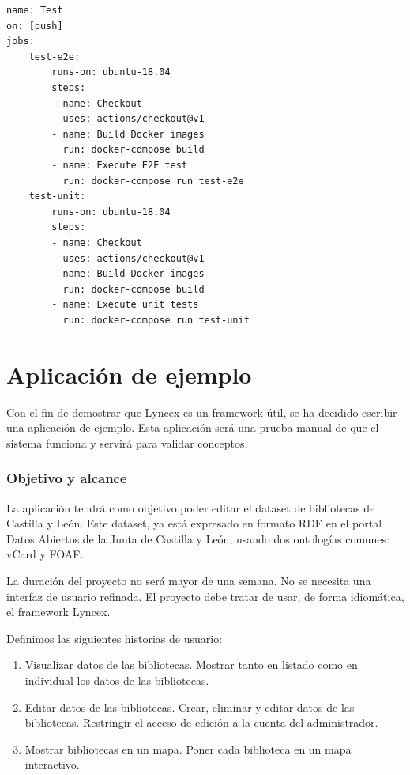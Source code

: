 \documentclass[12pt]{report} %
\begin{document}
\begin{lstlisting}
name: Test
on: [push]
jobs:
    test-e2e:
        runs-on: ubuntu-18.04
        steps:
        - name: Checkout
          uses: actions/checkout@v1
        - name: Build Docker images
          run: docker-compose build
        - name: Execute E2E test
          run: docker-compose run test-e2e
    test-unit:
        runs-on: ubuntu-18.04
        steps:
        - name: Checkout
          uses: actions/checkout@v1
        - name: Build Docker images
          run: docker-compose build
        - name: Execute unit tests
          run: docker-compose run test-unit
\end{lstlisting}

\chapter{Aplicación de ejemplo}

Con el fin de demostrar que Lyncex es un framework útil, se ha decidido escribir una aplicación de ejemplo. Esta aplicación será una prueba manual de que el sistema funciona y servirá para validar conceptos.

\subsection{Objetivo y alcance}

La aplicación tendrá como objetivo poder editar el dataset de bibliotecas de Castilla y León. Este dataset, ya está expresado en formato RDF en el portal Datos Abiertos de la Junta de Castilla y León, usando dos ontologías comunes: vCard y FOAF.

La duración del proyecto no será mayor de una semana. No se necesita una interfaz de usuario refinada. El proyecto debe tratar de usar, de forma idiomática, el framework Lyncex.

Definimos las siguientes historias de usuario:
\begin{enumerate}
    \item Visualizar datos de las bibliotecas. Mostrar tanto en listado como en individual los datos de las bibliotecas.
    \item Editar datos de las bibliotecas. Crear, eliminar y editar datos de las bibliotecas. Restringir el acceso de edición a la cuenta del administrador.
    \item Mostrar bibliotecas en un mapa. Poner cada biblioteca en un mapa interactivo.
\end{enumerate}
\end{document}
